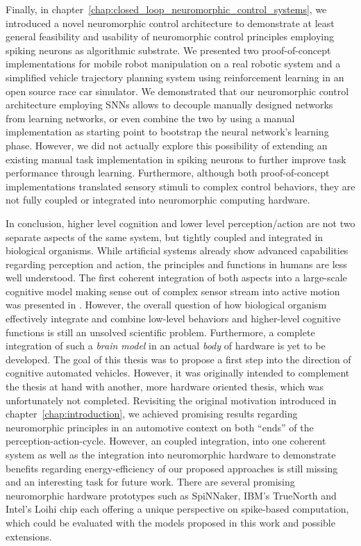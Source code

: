 Finally, in chapter~\ref{chap:closed_loop_neuromorphic_control_systems}, we introduced a novel neuromorphic control architecture to demonstrate at least general feasibility and usability of neuromorphic control principles employing spiking neurons as algorithmic substrate.
We presented two proof-of-concept implementations for mobile robot manipulation on a real robotic system and a simplified vehicle trajectory planning system using reinforcement learning in an open source race car simulator.
We demonstrated that our neuromorphic control architecture employing \acp{SNN} allows to decouple manually designed networks from learning networks, or even combine the two by using a manual implementation as starting point to bootstrap the neural network's learning phase.
However, we did not actually explore this possibility of extending an existing manual task implementation in spiking neurons to further improve task performance through learning.
Furthermore, although both proof-of-concept implementations translated sensory stimuli to complex control behaviors, they are not fully coupled or integrated into neuromorphic computing hardware.

In conclusion, higher level cognition and lower level perception/action are not two separate aspects of the same system, but tightly coupled and integrated in biological organisms.
While artificial systems already show advanced capabilities regarding perception and action, the principles and functions in humans are less well understood.
The first coherent integration of both aspects into a large-scale cognitive model making sense out of complex sensor stream into active motion was presented in \textcite{Eliasmith2012}.
However, the overall question of how biological organism effectively integrate and combine low-level behaviors and higher-level cognitive functions is still an unsolved scientific problem.
Furthermore, a complete integration of such a \emph{brain model} in an actual \emph{body} of hardware is yet to be developed.
The goal of this thesis was to propose a first step into the direction of cognitive automated vehicles.
However, it was originally intended to complement the thesis at hand with another, more hardware oriented thesis, which was unfortunately not completed.
Revisiting the original motivation introduced in chapter~\ref{chap:introduction}, we achieved promising results regarding neuromorphic principles in an automotive context on both \enquote{ends} of the perception-action-cycle.
However, an coupled integration, into one coherent system as well as the integration into neuromorphic hardware to demonstrate benefits regarding energy-efficiency of our proposed approaches is still missing and an interesting task for future work.
There are several promising neuromorphic hardware prototypes such as \ac{SpiNNaker}, IBM's TrueNorth and Intel's Loihi chip each offering a unique perspective on spike-based computation, which could be evaluated with the models proposed in this work and possible extensions.

